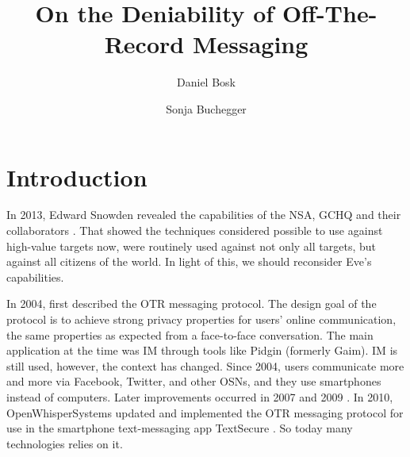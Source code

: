 \title{%
  On the Deniability of Off-The-Record Messaging
}
\author{%
  Daniel Bosk
  \and
  Sonja Buchegger
}

\maketitle


\acresetall
\section{Introduction}

In 2013, Edward Snowden \cite{landau2013making} revealed the capabilities of 
the \ac{NSA}, \ac{GCHQ} and their collaborators \cite[e.g.][]{nsa1,nsa2}.
That showed the techniques considered possible to use against high-value 
targets now, were routinely used against not only all targets, but against all 
citizens of the world.
In light of this, we should reconsider Eve's capabilities.

In 2004, \citeauthor{otr2004} \cite{otr2004} first described the \ac{OTR} 
messaging protocol.
The design goal of the protocol is to achieve strong privacy properties for 
users' online communication, the same properties as expected from 
a face-to-face conversation.
The main application at the time was \ac{IM} through tools like Pidgin 
\cite{pidgin} (formerly Gaim).
\ac{IM} is still used, however, the context has changed.
Since 2004, users communicate more and more via Facebook, Twitter, and other 
\acp{OSN}, and they use smartphones instead of computers.
Later improvements occurred in 2007 \cite{otr2007} and 2009 \cite{multiotr2009}.
In 2010, OpenWhisperSystems updated and implemented the \ac{OTR} messaging 
protocol for use in the smartphone text-messaging app TextSecure 
\cite{textsecure}.
So today many technologies relies on it.

